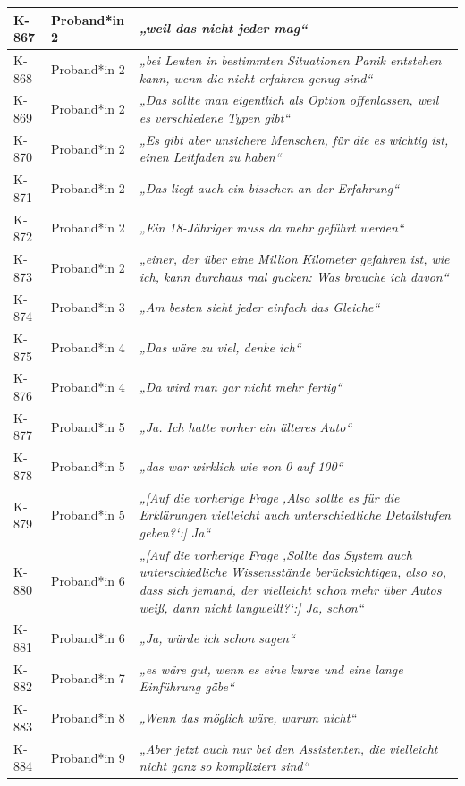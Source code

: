 {\begin{xltabular}{\textwidth}{
    |P{0.10\textwidth}
    |P{0.17\textwidth}
    |Y|
}
K-867 & Proband*in 2 & \textit{„weil das nicht jeder mag“} \\
\hline
K-868 & Proband*in 2 & \textit{„bei Leuten in bestimmten Situationen Panik entstehen kann, wenn die nicht erfahren genug sind“} \\
\hline
K-869 & Proband*in 2 & \textit{„Das sollte man eigentlich als Option offenlassen, weil es verschiedene Typen gibt“} \\
\hline
K-870 & Proband*in 2 & \textit{„Es gibt aber unsichere Menschen, für die es wichtig ist, einen Leitfaden zu haben“} \\
\hline
K-871 & Proband*in 2 & \textit{„Das liegt auch ein bisschen an der Erfahrung“} \\
\hline
K-872 & Proband*in 2 & \textit{„Ein 18-Jähriger muss da mehr geführt werden“} \\
\hline
K-873 & Proband*in 2 & \textit{„einer, der über eine Million Kilometer gefahren ist, wie ich, kann durchaus mal gucken: Was brauche ich davon“} \\
\hline
K-874 & Proband*in 3 & \textit{„Am besten sieht jeder einfach das Gleiche“} \\
\hline
K-875 & Proband*in 4 & \textit{„Das wäre zu viel, denke ich“} \\
\hline
K-876 & Proband*in 4 & \textit{„Da wird man gar nicht mehr fertig“} \\
\hline
K-877 & Proband*in 5 & \textit{„Ja. Ich hatte vorher ein älteres Auto“} \\
\hline
K-878 & Proband*in 5 & \textit{„das war wirklich wie von 0 auf 100“} \\
\hline
K-879 & Proband*in 5 & \textit{„[Auf die vorherige Frage ‚Also sollte es für die Erklärungen vielleicht auch unterschiedliche Detailstufen geben?‘:] Ja“} \\
\hline
K-880 & Proband*in 6 & \textit{„[Auf die vorherige Frage ‚Sollte das System auch unterschiedliche Wissensstände berücksichtigen, also so, dass sich jemand, der vielleicht schon mehr über Autos weiß, dann nicht langweilt?‘:] Ja, schon“} \\
\hline
K-881 & Proband*in 6 & \textit{„Ja, würde ich schon sagen“} \\
\hline
K-882 & Proband*in 7 & \textit{„es wäre gut, wenn es eine kurze und eine lange Einführung gäbe“} \\
\hline
K-883 & Proband*in 8 & \textit{„Wenn das möglich wäre, warum nicht“} \\
\hline
K-884 & Proband*in 9 & \textit{„Aber jetzt auch nur bei den Assistenten, die vielleicht nicht ganz so kompliziert sind“} \\

\end{xltabular}}
